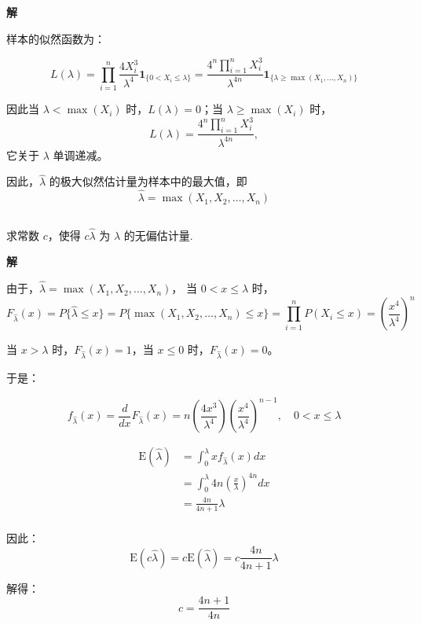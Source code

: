 \documentclass[12pt,a4paper]{article}
\begin{document}
\begin{answerbox}
\textbf{解}  

  样本的似然函数为：

  $$
  L(\lambda) = \prod_{i=1}^n \frac{4X_i^3}{\lambda^4}\mathbf{1}_{\{0<X_i\le \lambda\}}
  = \frac{4^n \prod_{i=1}^n X_i^3}{\lambda^{4n}} \mathbf{1}_{\{\lambda \ge \max(X_1,\ldots,X_n)\}}
  $$

  因此当 $\lambda < \max(X_i)$ 时，$L(\lambda)=0$；当 $\lambda \ge \max(X_i)$ 时，
  $$
  L(\lambda)=\frac{4^n \prod_{i=1}^n X_i^3}{\lambda^{4n}},
  $$
  它关于 $\lambda$ 单调递减。
  
  因此，$\hat{\lambda}$ 的极大似然估计量为样本中的最大值，即 
  $$\hat{\lambda} = \max(X_1, X_2, \ldots, X_n)$$

\end{answerbox}

\subsection{}
求常数 $c$，使得 $c\hat{\lambda}$ 为 $\lambda$ 的无偏估计量.

\begin{answerbox}
\textbf{解}  

  由于，$\hat{\lambda} = \max(X_1, X_2, \ldots, X_n)$，
  当 $0 < x \leq \lambda$ 时，
  $$F_{\hat{\lambda}}(x) = P\{\hat{\lambda} \leq x\} = P\{\max(X_1, X_2, \ldots, X_n) \leq x\} = \prod_{i=1}^n P(X_i \leq x) = \left(\frac{x^4}{\lambda^4}\right)^n$$
  
  当 $x > \lambda$ 时，$F_{\hat{\lambda}}(x) = 1$，当 $x \leq 0$ 时，$F_{\hat{\lambda}}(x) = 0$。
  
  于是：

  $$
  f_{\hat{\lambda}}(x) = \frac{d}{dx} F_{\hat{\lambda}}(x) = n \left(\frac{4x^3}{\lambda^4}\right) \left(\frac{x^4}{\lambda^4}\right)^{n-1}, \quad 0 < x \leq \lambda
  $$

  $$
  \begin{aligned}
  \mathrm{E}(\hat{\lambda}) &= \int_0^\lambda x f_{\hat{\lambda}}(x) dx \\
  &= \int_0^{\lambda} 4n \left(\frac{x}{\lambda}\right)^{4n} dx \\
  &= \frac{4n}{4n+1} \lambda \\
  \end{aligned}
  $$

  因此：
  $$\mathrm{E}(c\hat{\lambda}) = c\mathrm{E}(\hat{\lambda}) = c\frac{4n}{4n+1}\lambda$$

  解得：
  $$c = \frac{4n+1}{4n}$$
\end{answerbox}
\end{document}
